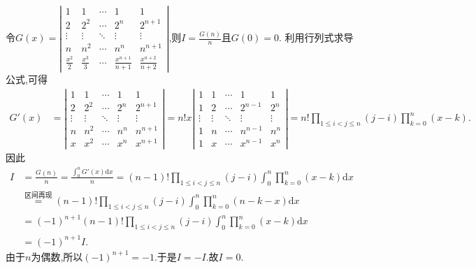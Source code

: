 \documentclass[../../main.tex]{subfiles}
\begin{document}
\begin{solution}
令\(G(x)=\left|\begin{matrix}
1 & 1 & \cdots & 1 & 1\\
2 & 2^2 & \cdots & 2^n & 2^{n + 1}\\
\vdots & \vdots & \ddots & \vdots & \vdots\\
n & n^2 & \cdots & n^n & n^{n + 1}\\
\frac{x^2}{2} & \frac{x^3}{3} & \cdots & \frac{x^{n + 1}}{n + 1} & \frac{x^{n + 2}}{n + 2}
\end{matrix}\right|\),则\(I = \frac{G(n)}{n}\)且\(G(0) = 0\).      
利用行列式求导公式,可得
\begin{align*}
G'(x)&=\left|\begin{matrix}
1 & 1 & \cdots & 1 & 1\\
2 & 2^2 & \cdots & 2^n & 2^{n + 1}\\
\vdots & \vdots & \ddots & \vdots & \vdots\\
n & n^2 & \cdots & n^n & n^{n + 1}\\
x & x^2 & \cdots & x^n & x^{n + 1}
\end{matrix}\right|
= n!x\left|\begin{matrix}
1 & 1 & \cdots & 1 & 1\\
1 & 2 & \cdots & 2^{n - 1} & 2^n\\
\vdots & \vdots & \ddots & \vdots & \vdots\\
1 & n & \cdots & n^{n - 1} & n^n\\
1 & x & \cdots & x^{n - 1} & x^n
\end{matrix}\right|
= n!\prod_{1\leqslant i < j\leqslant n}(j - i)\prod_{k = 0}^{n}(x - k).
\end{align*}
因此
\begin{align*}
I &= \frac{G(n)}{n}=\frac{\int_{0}^{n}G'(x)\mathrm{d}x}{n}=(n - 1)!\prod_{1\leqslant i < j\leqslant n}(j - i)\int_{0}^{n}\prod_{k = 0}^{n}(x - k)\mathrm{d}x
\\
&\stackrel{\text{区间再现}}{=}(n - 1)!\prod_{1\leqslant i < j\leqslant n}(j - i)\int_{0}^{n}\prod_{k = 0}^{n}(n - k - x)\mathrm{d}x
\\
&= (-1)^{n + 1}(n - 1)!\prod_{1\leqslant i < j\leqslant n}(j - i)\int_{0}^{n}\prod_{k = 0}^{n}(x - k)\mathrm{d}x
\\
&= (-1)^{n + 1}I.
\end{align*}      
由于\(n\)为偶数,所以\((-1)^{n + 1} = -1\).于是\(I = -I\).故\(I = 0\). 
\end{solution}
\end{document}
